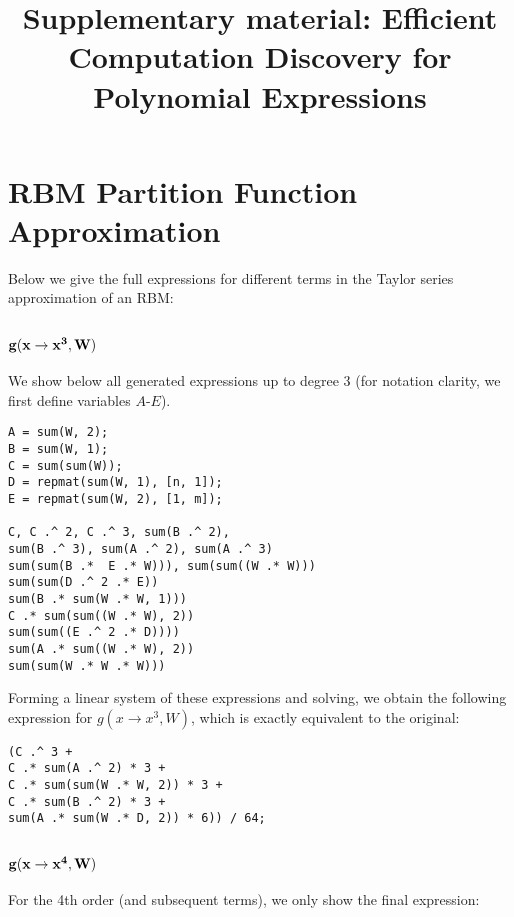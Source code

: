 \documentclass[]{article}
\title{Supplementary material: Efficient Computation Discovery for Polynomial Expressions}
\begin{document}
 

\maketitle

\section{RBM Partition Function Approximation}

Below we give the full expressions for different terms in the Taylor series approximation of an RBM:


\subsection{{$\bf g(x \rightarrow x^3, W)$}}

We show below all generated expressions up to degree 
$3$ (for notation clarity, we first define variables $A$-$E$).

\begin{lstlisting}
A = sum(W, 2);
B = sum(W, 1);
C = sum(sum(W));
D = repmat(sum(W, 1), [n, 1]);
E = repmat(sum(W, 2), [1, m]);

C, C .^ 2, C .^ 3, sum(B .^ 2), 
sum(B .^ 3), sum(A .^ 2), sum(A .^ 3)
sum(sum(B .*  E .* W))), sum(sum((W .* W)))
sum(sum(D .^ 2 .* E))
sum(B .* sum(W .* W, 1)))
C .* sum(sum((W .* W), 2))
sum(sum((E .^ 2 .* D)))) 
sum(A .* sum((W .* W), 2))
sum(sum(W .* W .* W)))
\end{lstlisting}

Forming a linear system of these expressions and solving, we obtain
the following expression for $g(x \rightarrow x^3, W)$, which is
exactly equivalent to the original:
\vspace{-0.3cm}
\begin{lstlisting}
(C .^ 3 + 
C .* sum(A .^ 2) * 3 +
C .* sum(sum(W .* W, 2)) * 3 +
C .* sum(B .^ 2) * 3 + 
sum(A .* sum(W .* D, 2)) * 6)) / 64;
\end{lstlisting}



\subsection{{$\bf g(x \rightarrow x^4, W)$}}

For the 4th order (and subsequent terms), we only show the final expression:
\end{document}
